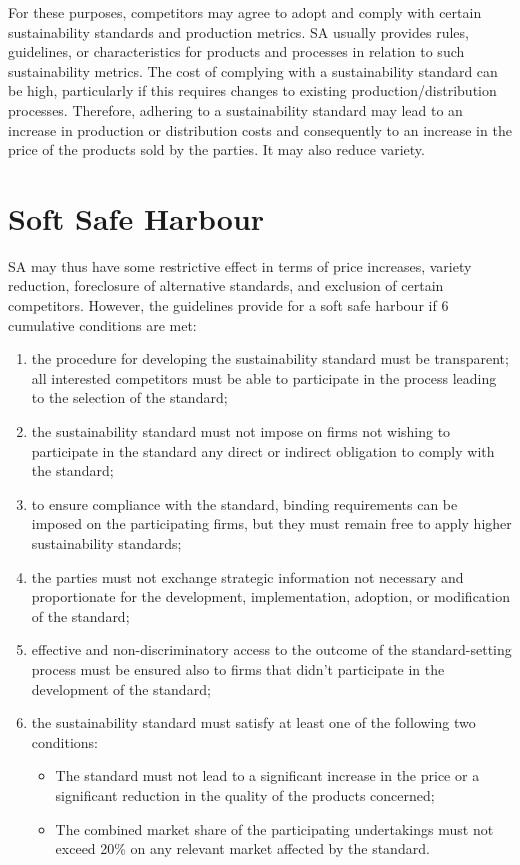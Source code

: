         For these purposes, competitors may agree to adopt and comply with certain sustainability standards and production metrics.  
        SA usually provides rules, guidelines, or characteristics for products and processes in relation to such sustainability metrics.  
        The cost of complying with a sustainability standard can be high, particularly if this requires changes to existing production/distribution processes. Therefore, adhering to a sustainability standard may lead to an increase in production or distribution costs and consequently to an increase in the price of the products sold by the parties. It may also reduce variety.

\section{Soft Safe Harbour}

    SA may thus have some restrictive effect in terms of price increases, variety reduction, foreclosure of alternative standards, and exclusion of certain competitors.  
    However, the guidelines provide for a soft safe harbour if 6 cumulative conditions are met:
    \begin{enumerate}
        \item the procedure for developing the sustainability standard must be transparent; all interested competitors must be able to participate in the process leading to the selection of the standard;
        
        \item the sustainability standard must not impose on firms not wishing to participate in the standard any direct or indirect obligation to comply with the standard;
        
        \item to ensure compliance with the standard, binding requirements can be imposed on the participating firms, but they must remain free to apply higher sustainability standards;
        
        \item the parties must not exchange strategic information not necessary and proportionate for the development, implementation, adoption, or modification of the standard;
        
        \item effective and non-discriminatory access to the outcome of the standard-setting process must be ensured also to firms that didn’t participate in the development of the standard;
        
        \item the sustainability standard must satisfy at least one of the following two conditions:
        \begin{itemize}
            \item The standard must not lead to a significant increase in the price or a significant reduction in the quality of the products concerned;
            \item The combined market share of the participating undertakings must not exceed 20\% on any relevant market affected by the standard.
        \end{itemize}
    \end{enumerate}

